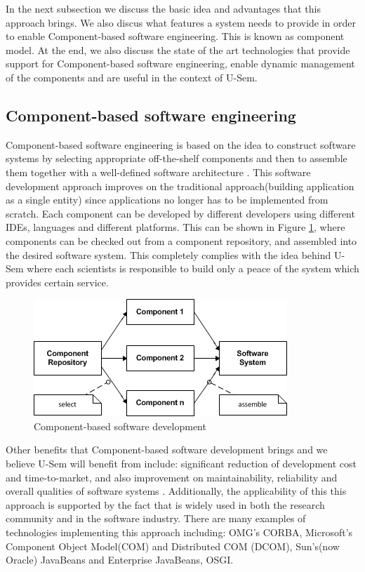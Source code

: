In the next subsection we discuss the basic idea and advantages that this approach brings. We also discus what features a system needs to provide in order to enable Component-based software engineering. This is known as component model. At the end, we also discuss the state of the art technologies that provide support for Component-based software engineering, enable dynamic management of the components and are useful in the context of U-Sem. 

\subsection{Component-based software engineering}

Component-based software engineering is based on the idea to construct software systems by selecting appropriate off-the-shelf components and then to assemble them together with a well-defined software architecture \cite{Pour}. This software development approach improves on the traditional approach(building application as a single entity) since applications no longer has to be implemented from scratch. Each component can be developed by different developers using different IDEs, languages and different platforms. This can be shown in Figure \ref{fig_cbsd}, where components can be checked out from a component repository, and assembled into the desired software system. This completely complies with the idea behind U-Sem where each scientists is responsible to build only a peace of the system which provides certain service.

\begin{figure}[h!]
  \centering
  	\includegraphics[scale=0.75]{plug-in/component-based.png}
  \caption{Component-based software development \cite{Pour} }
  \label{fig_cbsd}
\end{figure}

Other benefits that Component-based software development brings and we believe U-Sem will benefit from include: significant reduction of development cost and time-to-market, and also improvement on maintainability, reliability and overall qualities of software systems \cite{Pour1} \cite{Pour2}. Additionally, the applicability of this this approach is supported by the fact that is widely used in both the research community and in the software industry. There are many examples of technologies implementing this approach including: OMG's CORBA,  Microsoft's Component Object Model(COM) and Distributed COM (DCOM), Sun's(now Oracle) JavaBeans and Enterprise JavaBeans, OSGI.

